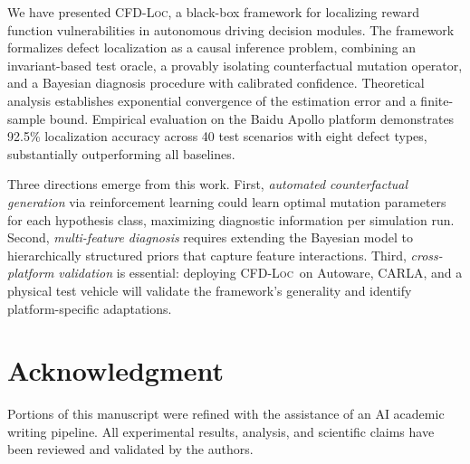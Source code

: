 \documentclass[journal]{IEEEtran}
\theoremstyle{plain}
\newcommand{\methodname}{\textsc{CFD-Loc}}
\begin{document}
We have presented \methodname, a black-box framework for localizing reward function vulnerabilities in autonomous driving decision modules. The framework formalizes defect localization as a causal inference problem, combining an invariant-based test oracle, a provably isolating counterfactual mutation operator, and a Bayesian diagnosis procedure with calibrated confidence. Theoretical analysis establishes exponential convergence of the estimation error and a finite-sample bound. Empirical evaluation on the Baidu Apollo platform demonstrates 92.5\% localization accuracy across 40 test scenarios with eight defect types, substantially outperforming all baselines.

Three directions emerge from this work. First, \emph{automated counterfactual generation} via reinforcement learning could learn optimal mutation parameters for each hypothesis class, maximizing diagnostic information per simulation run. Second, \emph{multi-feature diagnosis} requires extending the Bayesian model to hierarchically structured priors that capture feature interactions. Third, \emph{cross-platform validation} is essential: deploying \methodname\ on Autoware, CARLA, and a physical test vehicle will validate the framework's generality and identify platform-specific adaptations.

\section*{Acknowledgment}
Portions of this manuscript were refined with the assistance of an AI academic writing pipeline. All experimental results, analysis, and scientific claims have been reviewed and validated by the authors.

\balance


\end{document}
